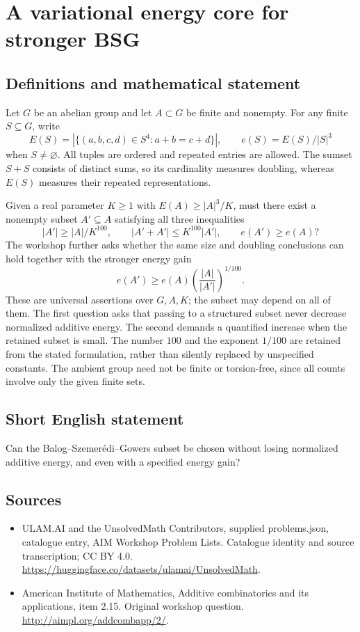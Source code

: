\documentclass[11pt,a4paper]{article}
\begin{document}
\section*{A variational energy core for stronger BSG}\label{statement}

\subsection{Definitions and mathematical statement}
Let $G$ be an abelian group and let $A\subset G$ be finite and nonempty.
For any finite $S\subseteq G$, write
\[
 E(S)=|\{(a,b,c,d)\in S^4:a+b=c+d\}|,
 \qquad e(S)=E(S)/|S|^3
\]
when $S\ne\varnothing$.
All tuples are ordered and repeated entries are allowed.
The sumset $S+S$ consists of distinct sums, so its cardinality measures doubling, whereas $E(S)$ measures their repeated representations.

Given a real parameter $K\geq1$ with $E(A)\geq |A|^3/K$, must there exist a nonempty subset $A'\subseteq A$ satisfying all three inequalities
\[
 |A'|\geq |A|/K^{100},\qquad
 |A'+A'|\leq K^{100}|A'|,\qquad e(A')\geq e(A)?
\]
The workshop further asks whether the same size and doubling conclusions can hold together with the stronger energy gain
\[
 e(A')\geq e(A)\left(\frac{|A|}{|A'|}\right)^{1/100}.
\]
These are universal assertions over $G,A,K$; the subset may depend on all of them.
The first question asks that passing to a structured subset never decrease normalized additive energy.
The second demands a quantified increase when the retained subset is small.
The number $100$ and the exponent $1/100$ are retained from the stated formulation, rather than silently replaced by unspecified constants.
The ambient group need not be finite or torsion-free, since all counts involve only the given finite sets.
\subsection{Short English statement}
Can the Balog--Szemerédi--Gowers subset be chosen without losing normalized additive energy, and even with a specified energy gain?
\subsection{Sources}
\begin{itemize}
\item[S1] ULAM.AI and the UnsolvedMath Contributors, supplied problems.json, catalogue entry, AIM Workshop Problem Lists. Catalogue identity and source transcription; CC BY 4.0.
\url{https://huggingface.co/datasets/ulamai/UnsolvedMath}.
\item[S2] American Institute of Mathematics, Additive combinatorics and its applications, item 2.15. Original workshop question.
\url{http://aimpl.org/addcombapp/2/}.
\end{itemize}
\end{document}

